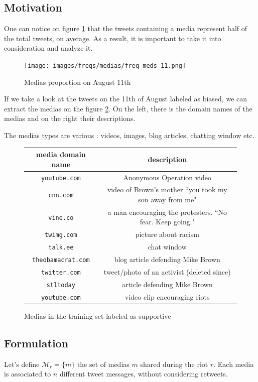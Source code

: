 \documentclass[a4paper,twoside,12pt,openright]{report}
\begin{document}
\subsection{Motivation}
One can notice on figure \ref{mediaFreq11} that the tweets containing a media represent half of the total tweets, on average. As a result, it is important to take it into consideration and analyze it.

\begin{figure}[H]
\centering
\texttt{[image: images/freqs/medias/freq\_meds\_11.png]}
\caption{Medias proportion on August 11th}
\label{mediaFreq11}
\end{figure}

If we take a look at the tweets on the 11th of August labeled as biased, we can extract the medias on the figure \ref{tweets500mediasBiaised}. On the left, there is the domain names of the medias and on the right their descriptions.

The medias types are various : videos, images, blog articles, chatting window etc.
\begin{figure}[H]
  \centering
\begin{tabular}{|c|c|}
\hline
media domain name & description \\ \hline
\texttt{youtube.com} & Anonymous Operation video \\ \hline
\texttt{cnn.com} & video of Brown's mother ``you took my son away from me" \\ \hline
\texttt{vine.co} & a man encouraging the protesters. ``No fear. Keep going." \\ \hline
\texttt{twimg.com} & picture about racism \\ \hline
\texttt{talk.ee} & chat window \\ \hline
\texttt{theobamacrat.com} & blog article defending Mike Brown \\ \hline
\texttt{twitter.com} & tweet/photo of an activist (deleted since) \\ \hline
\texttt{stltoday} & article defending Mike Brown \\ \hline
\texttt{youtube.com} & video clip encouraging riots \\ \hline
\hline
\end{tabular}
\caption{Medias in the training set labeled as supportive}
\label{tweets500mediasBiaised}
\end{figure}

\newpage

\subsection{Formulation}
Let's define $ \mathcal{M}_r = \{ m \} $ the set of medias $m$ shared during the riot $r$. Each media is associated to $n$ different tweet messages, without considering retweets.
\end{document}
